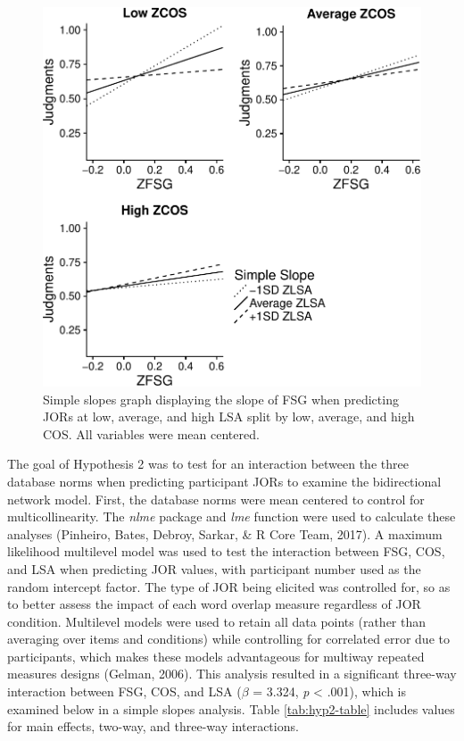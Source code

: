 \documentclass[english,man]{apa6}
\theoremstyle{definition}
\theoremstyle{definition}
\theoremstyle{definition}
\theoremstyle{remark}
\begin{document}
\begin{figure}
\centering
\includegraphics{max_buch_JOL_files/figure-latex/hyp2graph-1.pdf}
\caption{\label{fig:hyp2graph}Simple slopes graph displaying the slope of
FSG when predicting JORs at low, average, and high LSA split by low,
average, and high COS. All variables were mean centered.}
\end{figure}

The goal of Hypothesis 2 was to test for an interaction between the
three database norms when predicting participant JORs to examine the
bidirectional network model. First, the database norms were mean
centered to control for multicollinearity. The \emph{nlme} package and
\emph{lme} function were used to calculate these analyses (Pinheiro,
Bates, Debroy, Sarkar, \& R Core Team, 2017). A maximum likelihood
multilevel model was used to test the interaction between FSG, COS, and
LSA when predicting JOR values, with participant number used as the
random intercept factor. The type of JOR being elicited was controlled
for, so as to better assess the impact of each word overlap measure
regardless of JOR condition. Multilevel models were used to retain all
data points (rather than averaging over items and conditions) while
controlling for correlated error due to participants, which makes these
models advantageous for multiway repeated measures designs (Gelman,
2006). This analysis resulted in a significant three-way interaction
between FSG, COS, and LSA (\(\beta\) = 3.324, \emph{p} \textless{}
.001), which is examined below in a simple slopes analysis. Table
\ref{tab:hyp2-table} includes values for main effects, two-way, and
three-way interactions.
\end{document}
